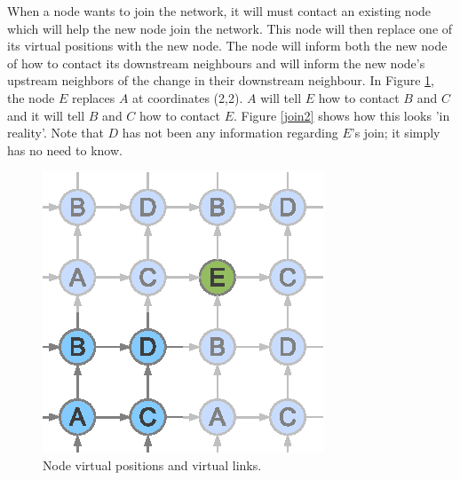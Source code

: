 \documentclass[ %
                    author={Luke Murray},
                supervisor={Dr. Simon Hollis},
                     title={Shadow Peer-to-Peer Networks},
                  subtitle={},
                    degree={MEng},
                      year={2013} ]{thesis}
\begin{document}
When a node wants to join the network, it will must contact an existing node which will help the new node join the network. This node will then replace one of its virtual positions with the new node. The node will inform both the new node of how to contact its downstream neighbours and will inform the new node's upstream neighbors of the change in their downstream neighbour. In Figure \ref{join1}, the node $E$ replaces $A$ at coordinates (2,2). $A$ will tell $E$ how to contact $B$ and $C$ and it will tell $B$ and $C$ how to contact $E$. Figure \ref{join2} shows how this looks 'in reality'. Note that $D$ has not been any information regarding $E$'s join; it simply has no need to know.

\begin{figure}[h]%
    \centering
    \begin{minipage}[b]{0.35\linewidth}
        \centering
        \includegraphics[width=\linewidth]{diagrams/network_join1.eps}
        \caption{Node virtual positions and virtual links.}
        \label{join1}
    \end{minipage}
    \hspace{0.5cm}
    \begin{minipage}[b]{0.35\linewidth}
        \centering

\end{minipage}
\end{figure}
\end{document}
